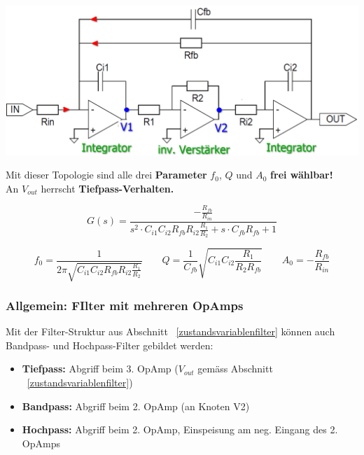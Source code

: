 \begin{minipage}[c]{0.6\columnwidth}
    \includegraphics[width=\columnwidth]{images/zustandsvariablenfilter.png}
\end{minipage}
\hfill
\begin{minipage}[c]{0.38\columnwidth}
    Mit dieser Topologie sind alle drei \textbf{Parameter} $f_0$, $Q$ und $A_0$ \textbf{frei wählbar!} \\
    An $V_{out}$ herrscht \textbf{Tiefpass-Verhalten.}
\end{minipage}

$$ \boxed{ G(s) = \frac{- \frac{R_{fb}}{R_{in}}}{s^2 \cdot C_{i1} C_{i2} R_{fb} R_{i2} \frac{R_1}{R_2} + s \cdot C_{fb} R_{fb} + 1} } $$

$$ f_0 = \frac{1}{2 \pi \sqrt{C_{i1} C_{i2} R_{fb} R_{i2} \frac{R_1}{R_2}}} \qquad Q = \frac{1}{C_{fb}} \sqrt{C_{i1} C_{i2} \frac{R_1}{R_2 R_{fb}} } 
\qquad A_0 = - \frac{R_{fb}}{R_{in}} $$


\subsubsection{Allgemein: FIlter mit mehreren OpAmps}

Mit der Filter-Struktur aus Abschnitt ~\ref{zustandsvariablenfilter} können auch Bandpass- und Hochpass-Filter gebildet werden:
\begin{itemize}
    \item \textbf{Tiefpass:} Abgriff beim 3. OpAmp ($V_{out}$ gemäss Abschnitt ~\ref{zustandsvariablenfilter})
    \item \textbf{Bandpass:} Abgriff beim 2. OpAmp (an Knoten V2)
    \item \textbf{Hochpass:} Abgriff beim 2. OpAmp, Einspeisung am neg. Eingang des 2. OpAmps 
\end{itemize}


